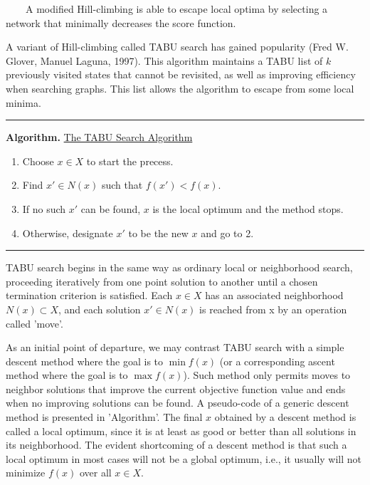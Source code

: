 ~~~~A modified Hill-climbing is able to escape local optima by selecting a network that minimally decreases the score function.

A variant of Hill-climbing called TABU search has gained popularity (Fred W. Glover, Manuel Laguna, 1997). This algorithm maintains a TABU list of $k$ previously visited states that cannot be revisited, as well as improving efficiency when searching graphs. This list allows the algorithm to escape from some local minima.

\begin{center}\rule[0.5ex]{0.9\columnwidth}{1pt}\end{center}

\textbf{Algorithm.} \underline{The TABU Search Algorithm}

\begin{enumerate}
	\item Choose $x \in X$ to start the precess.
	
	\item Find $x' \in N(x)$ such that $f(x') < f(x)$.
	
	\item If no such $x'$ can be found, $x$ is the local optimum and the method stops.
	
	\item Otherwise, designate $x'$ to be the new $x$ and go to 2.
\end{enumerate}

\begin{center}\rule[0.5ex]{0.9\columnwidth}{1pt}\end{center}

TABU search begins in the same way as ordinary local or neighborhood search, proceeding iteratively from one point solution to another until a chosen termination criterion is satisfied. Each $x \in X$ has an associated neighborhood $N(x) \subset X$, and each solution $x' \in N(x)$ is reached from x by an operation called 'move'.

As an initial point of departure, we may contrast TABU search with a simple descent method where the goal is to $\min f(x)$ (or a corresponding ascent method where the goal is to $\max f(x)$). Such method only permits moves to neighbor solutions that improve the current objective function value and ends when no improving solutions can be found. A pseudo-code of a generic descent method is presented in 'Algorithm'. The final $x$ obtained by a descent method is called a local optimum, since it is at least as good or better than all solutions in its neighborhood. The evident shortcoming of a descent method is that such a local optimum in most cases will not be a global optimum, i.e., it usually will not minimize $f(x)$ over all $x \in X$.